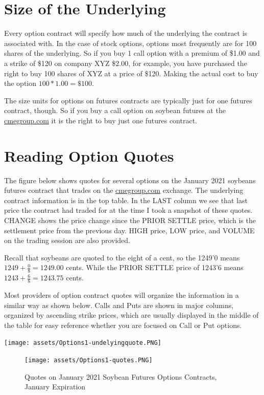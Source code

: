 \documentclass[
  letterpaper,
  DIV=11,
  numbers=noendperiod]{scrreprt}
\begin{document}
\section{Size of the Underlying}\label{size-of-the-underlying}

Every option contract will specify how much of the underlying the
contract is associated with. In the case of stock options, options most
frequently are for 100 shares of the underlying. So if you buy 1 call
option with a premium of \$1.00 and a strike of \$120 on company XYZ
\$2.00, for example, you have purchased the right to buy 100 shares of
XYZ at a price of \$120. Making the actual cost to buy the option
\(100*1.00 = \$100\).

The size units for options on futures contracts are typically just for
one futures contract, though. So if you buy a call option on soybean
futures at the \url{cmegroup.com} it is the right to buy just one
futures contract.

\section{Reading Option Quotes}\label{reading-option-quotes}

The figure below shows quotes for several options on the January 2021
soybeans futures contract that trades on the \url{cmegroup.com}
exchange. The underlying contract information is in the top table. In
the LAST column we see that last price the contract had traded for at
the time I took a snapshot of these quotes. CHANGE shows the price
change since the PRIOR SETTLE price, which is the settlement price from
the previous day. HIGH price, LOW price, and VOLUME on the trading
session are also provided.

Recall that soybeans are quoted to the eight of a cent, so the 1249'0
means \(1249 + \frac{0}{8} = 1249.00\) cents. While the PRIOR SETTLE
price of 1243'6 means \(1243 + \frac{6}{8} = 1243.75\) cents.

Most providers of option contract quotes will organize the information
in a similar way as shown below. Calls and Puts are shown in major
columns, organized by ascending strike prices, which are usually
displayed in the middle of the table for easy reference whether you are
focused on Call or Put options.

\texttt{[image: assets/Options1-undelyingquote.PNG]}

\begin{figure}[H]

{\centering \texttt{[image: assets/Options1-quotes.PNG]}

}

\caption{Quotes on January 2021 Soybean Futures Options Contracts,
January Expiration}

\end{figure}%
\end{document}
